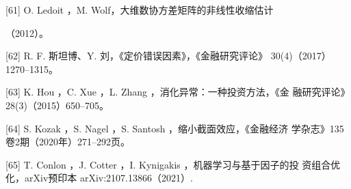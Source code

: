 \documentclass[UTF8]{ctexart}
\begin{document}
\begin{enumerate}
  {[}61{]} O. Ledoit ，M. Wolf，大维数协方差矩阵的非线性收缩估计

  （2012）。

  {[}62{]} R. F. 斯坦博、Y. 刘，《定价错误因素》，《金融研究评论》
  30(4)（2017）1270--1315。

  {[}63{]} K. Hou ，C. Xue ，L. Zhang ，消化异常：一种投资方法，《金
  融研究评论》28(3)（2015）650--705。

  {[}64{]} S. Kozak ，S. Nagel ，S. Santosh ，缩小截面效应，《金融经济
  学杂志》135卷2期（2020年）271--292页。

  {[}65{]} T. Conlon ，J. Cotter ，I. Kynigakis ，机器学习与基于因子的投
  资组合优化，arXiv预印本 arXiv:2107.13866（2021）.
\end{enumerate}
\end{document}
